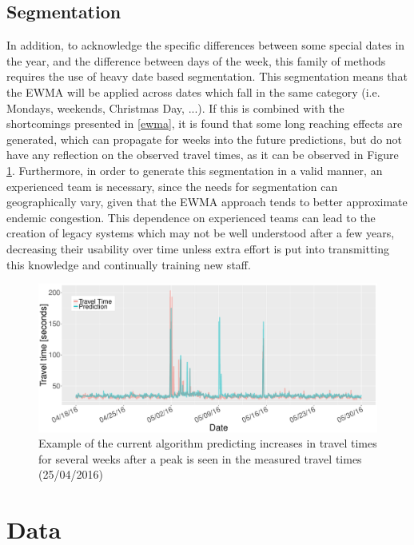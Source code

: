 \documentclass[conference, letterpaper]{IEEEtran}
\begin{document}
\subsection{Segmentation}\label{segmentation}
In addition, to acknowledge the specific differences between some special dates in the year, and the difference between days of the week, this family of methods requires the use of heavy date based segmentation. 
This segmentation means that the EWMA will be applied across dates which fall in the same category (i.e. Mondays, weekends, Christmas Day, ...).
If this is combined with the shortcomings presented in \ref{ewma}, it is found that some long reaching effects are generated, which can propagate for weeks into the future predictions, but do not have any reflection on the observed travel times, as it can be observed in Figure \ref{fig:EWMA_spike}.
Furthermore, in order to generate this segmentation in a valid manner, an experienced team is necessary, since the needs for segmentation can geographically vary, given that the EWMA approach tends to better approximate endemic congestion. 
This dependence on experienced teams can lead to the creation of legacy systems which may not be well understood after a few years, decreasing their usability over time unless extra effort is put into transmitting this knowledge and continually training new staff.
\begin{figure}
	\includegraphics[width=\linewidth]{EWMA.pdf}
	\caption{Example of the current algorithm predicting increases in travel times for several weeks after a peak is seen in the measured travel times (25/04/2016)}
	\label{fig:EWMA_spike}
\end{figure}


\section{Data}
\end{document}

